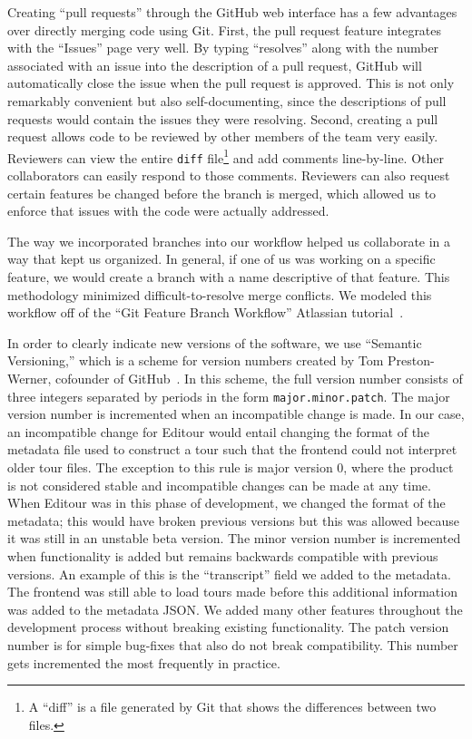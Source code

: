 \documentclass[a4paper, 10pt, american, titlepage]{article}
\begin{document}
Creating ``pull requests'' through the GitHub web interface has a few advantages
over directly merging code using Git. First, the pull request feature integrates
with the ``Issues'' page very well. By typing ``resolves'' along with the number
associated with an issue into the description of a pull request, GitHub will
automatically close the issue when the pull request is approved. This is not
only remarkably convenient but also self-documenting, since the descriptions of
pull requests would contain the issues they were resolving. Second, creating a
pull request allows code to be reviewed by other members of the team very
easily. Reviewers can view the entire \texttt{diff} file\footnote{A ``diff'' is
a file generated by Git that shows the differences between two files.} and add
comments line-by-line. Other collaborators can easily respond to those comments.
Reviewers can also request certain features be changed before the branch is
merged, which allowed us to enforce that issues with the code were actually
addressed.

The way we incorporated branches into our workflow helped us collaborate in a
way that kept us organized. In general, if one of us was working on a specific
feature, we would create a branch with a name descriptive of that feature. This
methodology minimized difficult-to-resolve merge conflicts. We modeled this
workflow off of the ``Git Feature Branch Workflow'' Atlassian
tutorial~\autocite{atlassian}.

In order to clearly indicate new versions of the software, we use ``Semantic
Versioning,'' which is a scheme for version numbers created by Tom
Preston-Werner, cofounder of GitHub~\autocite{prestonwerner}. In this scheme,
the full version number consists of three integers separated by periods in the
form \texttt{major.minor.patch}. The major version number is incremented when an
incompatible change is made. In our case, an incompatible change for Editour
would entail changing the format of the metadata file used to construct a tour
such that the frontend could not interpret older tour files. The exception to
this rule is major version 0, where the product is not considered stable and
incompatible changes can be made at any time. When Editour was in this phase of
development, we changed the format of the metadata; this would have broken
previous versions but this was allowed because it was still in an unstable beta
version. The minor version number is incremented when functionality is added but
remains backwards compatible with previous versions. An example of this is the
``transcript'' field we added to the metadata. The frontend was still able to
load tours made before this additional information was added to the metadata
JSON. We added many other features throughout the development process without
breaking existing functionality. The patch version number is for simple
bug-fixes that also do not break compatibility. This number gets incremented the
most frequently in practice.
\end{document}
